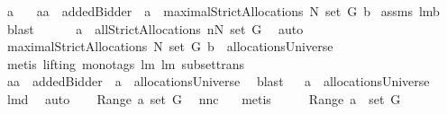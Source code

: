 \begin{isabellebody}
\ a\ \ \isanewline
{}{\isacharcolon}\ {\isachardoublequoteopen}{\isacharquery}a{\isacharequal}a\ {\isacharminus}{\isacharminus}\ addedBidder{\isacharprime}\ {\isacharampersand}\ a\ {\isasymin}\ maximalStrictAllocations{\isacharprime}\ N\ {\isacharparenleft}set\ G{\isacharparenright}\ b{\isachardoublequoteclose}\isanewline
{}\isamarkupfalse%
\ assms\ lm{}{}b\ \isamarkupfalse%
\ blast\isanewline
{}\isamarkupfalse%
\ \isamarkupfalse%
\ \isamarkupfalse%
\ \isanewline
{}{\isacharcolon}\ {\isachardoublequoteopen}a\ {\isasymin}\ allStrictAllocations{\isacharprime}\ {\isacharparenleft}{\isacharbraceleft}{\isacharquery}n{\isacharbraceright}{\isasymunion}N{\isacharparenright}\ {\isacharparenleft}set\ G{\isacharparenright}{\isachardoublequoteclose}\ \isamarkupfalse%
\ auto\isanewline
{}\isamarkupfalse%
\ \isamarkupfalse%
\ {\isachardoublequoteopen}maximalStrictAllocations{\isacharprime}\ N\ {\isacharparenleft}set\ G{\isacharparenright}\ b\ {\isasymsubseteq}\ allocationsUniverse{\isachardoublequoteclose}\ \isanewline
{}\isamarkupfalse%
\ {\isacharparenleft}metis\ {\isacharparenleft}lifting{\isacharcomma}\ mono{\isacharunderscore}tags{\isacharparenright}\ lm{}{}\ lm{}{}\ subset{\isacharunderscore}trans{\isacharparenright}\isanewline
{}\isamarkupfalse%
\ \isamarkupfalse%
\ \isamarkupfalse%
\ {\isachardoublequoteopen}{\isacharquery}a{\isacharequal}a\ {\isacharminus}{\isacharminus}\ addedBidder{\isacharprime}\ {\isacharampersand}\ a\ {\isasymin}\ allocationsUniverse{\isachardoublequoteclose}\ \isamarkupfalse%
\ blast\isanewline
{}\isamarkupfalse%
\ \isamarkupfalse%
\ {\isachardoublequoteopen}{\isacharquery}a\ {\isasymin}\ allocationsUniverse{\isachardoublequoteclose}\ \isamarkupfalse%
\ lm{}{}d\ \isamarkupfalse%
\ auto\isanewline
{}\isamarkupfalse%
\ \isamarkupfalse%
\ {\isachardoublequoteopen}{\isasymUnion}\ Range\ a{\isacharequal}\ set\ G{\isachardoublequoteclose}\ \isamarkupfalse%
\ nn{}{}c\ {}\ \isamarkupfalse%
\ metis\isanewline
{}\isamarkupfalse%
\ \isamarkupfalse%
\ \isamarkupfalse%
\ {\isachardoublequoteopen}{\isasymUnion}\ Range\ {\isacharquery}a\ {\isasymsubseteq}\ set\ G{\isachardoublequoteclose}\ \isamarkupfalse%

\end{isabellebody}
